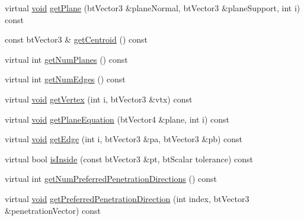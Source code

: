 \begin{DoxyCompactItemize}
virtual \mbox{\hyperlink{_thread_8h_af1e856da2e658414cb2456cb6f7ebc66}{void}} \mbox{\hyperlink{classnjli_1_1_physics_shape_box2_d_af97955a8925df43fa8339b742c0c082e}{get\+Plane}} (bt\+Vector3 \&plane\+Normal, bt\+Vector3 \&plane\+Support, int i) const
\item 
const bt\+Vector3 \& \mbox{\hyperlink{classnjli_1_1_physics_shape_box2_d_aa4e53789b8520050a5c84c7ad6ad3489}{get\+Centroid}} () const
\item 
virtual int \mbox{\hyperlink{classnjli_1_1_physics_shape_box2_d_a78cebc044d0dce9bfbf9bbad31398419}{get\+Num\+Planes}} () const
\item 
virtual int \mbox{\hyperlink{classnjli_1_1_physics_shape_box2_d_ab116e4bce67ace59c1d7b6f687a66d75}{get\+Num\+Edges}} () const
\item 
virtual \mbox{\hyperlink{_thread_8h_af1e856da2e658414cb2456cb6f7ebc66}{void}} \mbox{\hyperlink{classnjli_1_1_physics_shape_box2_d_ad5d35467acfd3c047d0c85c9aa1ad415}{get\+Vertex}} (int i, bt\+Vector3 \&vtx) const
\item 
virtual \mbox{\hyperlink{_thread_8h_af1e856da2e658414cb2456cb6f7ebc66}{void}} \mbox{\hyperlink{classnjli_1_1_physics_shape_box2_d_a89174101a9d32e694bd005f77d42e60b}{get\+Plane\+Equation}} (bt\+Vector4 \&plane, int i) const
\item 
virtual \mbox{\hyperlink{_thread_8h_af1e856da2e658414cb2456cb6f7ebc66}{void}} \mbox{\hyperlink{classnjli_1_1_physics_shape_box2_d_a34a87015a53f50f543d106bd3af1ab07}{get\+Edge}} (int i, bt\+Vector3 \&pa, bt\+Vector3 \&pb) const
\item 
virtual bool \mbox{\hyperlink{classnjli_1_1_physics_shape_box2_d_a7275508a58e70148f5c1e0d26b5e1bd6}{is\+Inside}} (const bt\+Vector3 \&pt, bt\+Scalar tolerance) const
\item 
virtual int \mbox{\hyperlink{classnjli_1_1_physics_shape_box2_d_a1f43866f98bef22ba0fd9b30c1eee161}{get\+Num\+Preferred\+Penetration\+Directions}} () const
\item 
virtual \mbox{\hyperlink{_thread_8h_af1e856da2e658414cb2456cb6f7ebc66}{void}} \mbox{\hyperlink{classnjli_1_1_physics_shape_box2_d_aaab48e4259b37f9c13739982ef5b4904}{get\+Preferred\+Penetration\+Direction}} (int index, bt\+Vector3 \&penetration\+Vector) const
\end{DoxyCompactItemize}
